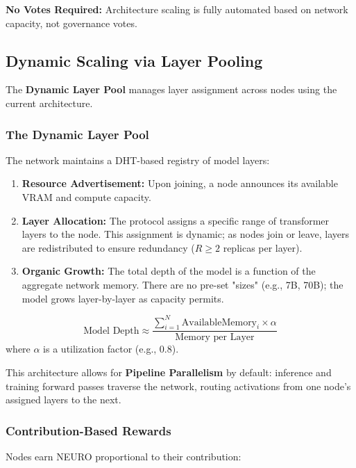 \documentclass[11pt,a4paper]{article}
\begin{document}
\textbf{No Votes Required:} Architecture scaling is fully automated based on network capacity, not governance votes.

\subsection{Dynamic Scaling via Layer Pooling}

The \textbf{Dynamic Layer Pool} manages layer assignment across nodes using the current architecture.

\subsubsection{The Dynamic Layer Pool}

The network maintains a DHT-based registry of model layers:

\begin{enumerate}
    \item \textbf{Resource Advertisement:} Upon joining, a node announces its available VRAM and compute capacity.
    \item \textbf{Layer Allocation:} The protocol assigns a specific range of transformer layers to the node. This assignment is dynamic; as nodes join or leave, layers are redistributed to ensure redundancy ($R \ge 2$ replicas per layer).
    \item \textbf{Organic Growth:} The total depth of the model is a function of the aggregate network memory. There are no pre-set "sizes" (e.g., 7B, 70B); the model grows layer-by-layer as capacity permits.
\end{enumerate}

\begin{equation}
\text{Model Depth} \approx \frac{\sum_{i=1}^{N} \text{AvailableMemory}_i \times \alpha}{\text{Memory per Layer}}
\end{equation}
where $\alpha$ is a utilization factor (e.g., 0.8).

This architecture allows for \textbf{Pipeline Parallelism} by default: inference and training forward passes traverse the network, routing activations from one node's assigned layers to the next.

\subsubsection{Contribution-Based Rewards}

Nodes earn NEURO proportional to their contribution:
\end{document}
